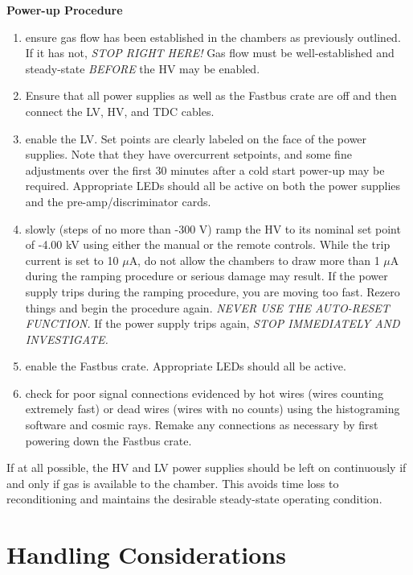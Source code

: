 {\begin{center}
{\bf Power-up Procedure}
\end{center}

\begin{enumerate}
\item {ensure gas flow has been established in the chambers as
previously outlined.  If it has not, {\it STOP RIGHT
HERE!}  Gas flow must be well-established and steady-state
{\it BEFORE} the HV may be enabled.}
\item {Ensure that all power supplies as well as the Fastbus crate
are off and then connect the LV, HV, and TDC cables.}
\item {enable the LV.  Set points are clearly labeled on the face of
the power supplies.  Note that they have overcurrent setpoints, and
some fine adjustments over the first 30 minutes after a cold start
power-up may be required.  Appropriate LEDs should all be active on
both the power supplies and the pre-amp/discriminator cards.}
\item {slowly (steps of no more than -300 V) ramp the HV to its
nominal set point of -4.00 kV using either the manual or the remote
controls.  While the trip current is set to 10 $\mu$A, do not allow
the chambers to draw more than 1 $\mu$A during the ramping procedure
or serious damage may result.  If the power supply trips during the
ramping procedure, you are moving too fast.  Rezero things and begin
the procedure again.  {\it NEVER USE THE AUTO-RESET FUNCTION.}}  If
the power supply trips again, {\it STOP IMMEDIATELY AND INVESTIGATE.}
\item {enable the Fastbus crate.  Appropriate LEDs should all be
active.}
\item {check for poor signal connections evidenced by hot wires (wires
counting extremely fast) or dead wires (wires with no counts) using
the histograming software and cosmic rays.  Remake any connections as
necessary by first powering down the Fastbus crate.}
\end{enumerate}

If at all possible, the HV and LV power supplies should be left
on continuously if and only if gas is available to the chamber.  This
avoids time loss to reconditioning and maintains the desirable
steady-state operating condition.

\section{Handling Considerations}

}

